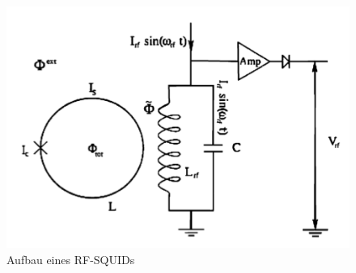 \begin{figure}[H]
	\centering \includegraphics[width = 0.7 \textwidth]{Bilder/SQUID.jpg}
	\caption{Aufbau eines RF-SQUIDs}
\end{figure}

































